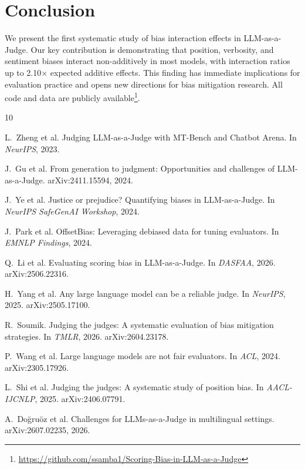 \documentclass[11pt,twocolumn]{article}
\begin{document}
\section{Conclusion}

We present the first systematic study of bias interaction effects in LLM-as-a-Judge. Our key contribution is demonstrating that position, verbosity, and sentiment biases interact non-additively in most models, with interaction ratios up to 2.10$\times$ expected additive effects. This finding has immediate implications for evaluation practice and opens new directions for bias mitigation research. All code and data are publicly available\footnote{\url{https://github.com/ssamba1/Scoring-Bias-in-LLM-as-a-Judge}}.

\begin{thebibliography}{10}

L.~Zheng et al.
Judging LLM-as-a-Judge with MT-Bench and Chatbot Arena.
In \textit{NeurIPS}, 2023.

J.~Gu et al.
From generation to judgment: Opportunities and challenges of LLM-as-a-Judge.
arXiv:2411.15594, 2024.

J.~Ye et al.
Justice or prejudice? Quantifying biases in LLM-as-a-Judge.
In \textit{NeurIPS SafeGenAI Workshop}, 2024.

J.~Park et al.
OffsetBias: Leveraging debiased data for tuning evaluators.
In \textit{EMNLP Findings}, 2024.

Q.~Li et al.
Evaluating scoring bias in LLM-as-a-Judge.
In \textit{DASFAA}, 2026. arXiv:2506.22316.

H.~Yang et al.
Any large language model can be a reliable judge.
In \textit{NeurIPS}, 2025. arXiv:2505.17100.

R.~Soumik.
Judging the judges: A systematic evaluation of bias mitigation strategies.
In \textit{TMLR}, 2026. arXiv:2604.23178.

P.~Wang et al.
Large language models are not fair evaluators.
In \textit{ACL}, 2024. arXiv:2305.17926.

L.~Shi et al.
Judging the judges: A systematic study of position bias.
In \textit{AACL-IJCNLP}, 2025. arXiv:2406.07791.

A.~Do\u{g}ru\"oz et al.
Challenges for LLMs-as-a-Judge in multilingual settings.
arXiv:2607.02235, 2026.

\end{thebibliography}
\end{document}
